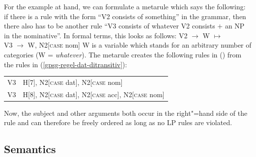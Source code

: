 For the example at hand, we can formulate a metarule which says the following: if there is a rule
with the form ``V2 consists of something'' in the grammar, then there also has to be another rule
``V3 consists of whatever V2 consists $+$ an NP in the nominative''. In formal terms, this looks as
follows: 
\ea
\label{subjekt-meta}
V2  $\to$ W $\mapsto$\\
V3  $\to$ W, N2[\textsc{case} nom]
\z
W is a variable which stands for an arbitrary number of categories (W = \emph{what\-ever}). The
metarule creates the following rules in () from the rules in (\ref{gpsg-regel-dat-ditransitiv}):
\ea
\begin{tabular}[t]{@{}l@{~$\to$~}l@{}}
V3  & H[7], N2[\textsc{case} dat], N2[\textsc{case} nom]                \\
V3  & H[8], N2[\textsc{case} dat], N2[\textsc{case} acc], N2[\textsc{case} nom]  \\
\end{tabular}
\z

\noindent
Now, the subject and other arguments both occur in the right"=hand side of the rule and can
therefore be freely ordered as long as no LP rules are violated.%


\subsection{Semantics}
\label{Sec-GPSG-Sem}


